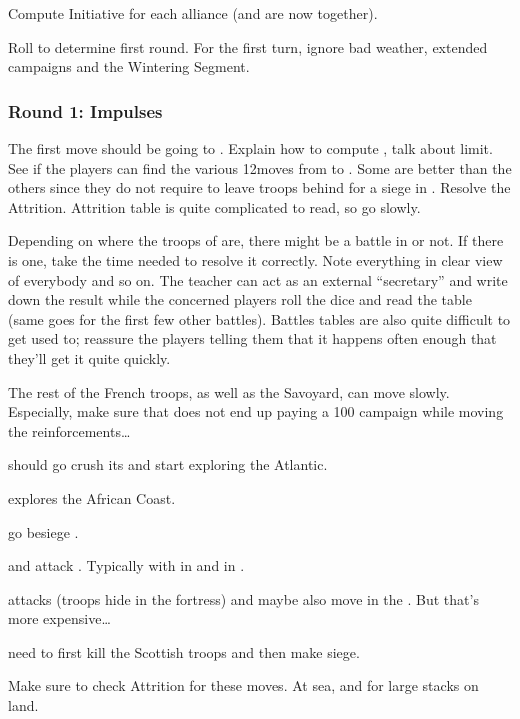 \aparag Compute Initiative for each alliance (\POL and \RUS are now together).

\aparag Roll to determine first round. For the first turn, ignore bad weather,
extended campaigns and the Wintering Segment.

\subsubsection{Round 1: Impulses}
\aparag The first move should be \FRA going to \villeNaples.
\bparag Explain how to compute \MP, talk about \MP limit. See if the players
can find the various 12\MP moves from \provinceProvence to
\provinceCampania. Some are better than the others since they do not require
to leave troops behind for a siege in \provinceAbruzzo.
\bparag Resolve the Attrition. Attrition table is quite complicated to read,
so go slowly.

\aparag Depending on where the troops of \paysNaples are, there might be a
battle in \provinceCampania or not. If there is one, take the time needed to
resolve it correctly. Note everything in clear view of everybody and so
on. The teacher can act as an external ``secretary'' and write down the result
while the concerned players roll the dice and read the table (same goes for
the first few other battles). Battles tables are also quite difficult to get
used to; reassure the players telling them that it happens often enough that
they'll get it quite quickly.

\aparag The rest of the French troops, as well as the Savoyard, can move
slowly. Especially, make sure that \FRA does not end up paying a 100\ducats
campaign while moving the reinforcements\ldots

\aparag \HIS should go crush its \REVOLT and start exploring the Atlantic.

\aparag \POR explores the African Coast.

\aparag \VEN go besiege \villeRagusa.

\aparag \POL and \RUS attack \paysCosaquesdon. Typically with \RUS in
 and \POL in \provinceDonets.

\aparag \TUR attacks \paysGeorgie (troops hide in the fortress) and maybe also
move in the \regionBalkans. But that's more expensive\ldots

\aparag \ANG need to first kill the Scottish troops and then make siege.

\aparag Make sure to check Attrition for these moves. At sea, and for large
stacks on land.

